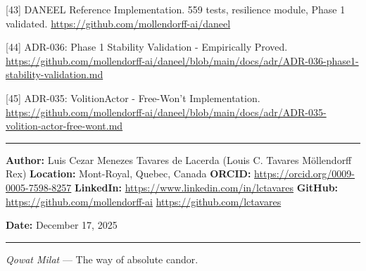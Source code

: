 \documentclass[
  11pt,
]{article}
\begin{document}
{[}43{]} DANEEL Reference Implementation. 559 tests, resilience module,
Phase 1 validated. \url{https://github.com/mollendorff-ai/daneel}

{[}44{]} ADR-036: Phase 1 Stability Validation - Empirically Proved.
\url{https://github.com/mollendorff-ai/daneel/blob/main/docs/adr/ADR-036-phase1-stability-validation.md}

{[}45{]} ADR-035: VolitionActor - Free-Won't Implementation.
\url{https://github.com/mollendorff-ai/daneel/blob/main/docs/adr/ADR-035-volition-actor-free-wont.md}

\begin{center}\rule{0.5\linewidth}{0.5pt}\end{center}

\textbf{Author:} Luis Cezar Menezes Tavares de Lacerda (Louis C. Tavares
\textbar{} Möllendorff Rex) \textbf{Location:} Mont-Royal, Quebec, Canada
\textbf{ORCID:} \url{https://orcid.org/0009-0005-7598-8257}
\textbf{LinkedIn:} \url{https://www.linkedin.com/in/lctavares}
\textbf{GitHub:} \url{https://github.com/mollendorff-ai} \textbar{}
\url{https://github.com/lctavares}

\textbf{Date:} December 17, 2025

\begin{center}\rule{0.5\linewidth}{0.5pt}\end{center}

\emph{Qowat Milat} --- The way of absolute candor.
\end{document}
